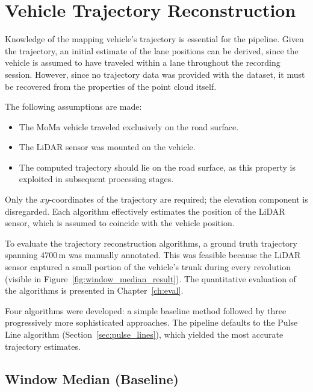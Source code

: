\section{Vehicle Trajectory Reconstruction}
\label{sec:car_trace}

Knowledge of the mapping vehicle's trajectory is essential for the pipeline. Given the trajectory, an initial estimate of the lane positions can be derived, since the vehicle is assumed to have traveled within a lane throughout the recording session. However, since no trajectory data was provided with the dataset, it must be recovered from the properties of the point cloud itself.

The following assumptions are made:
\begin{itemize}
  \item The MoMa vehicle traveled exclusively on the road surface.
  \item The LiDAR sensor was mounted on the vehicle.
  \item The computed trajectory should lie on the road surface, as this property is exploited in subsequent processing stages.
\end{itemize}

\noindent Only the $xy$-coordinates of the trajectory are required; the elevation component is disregarded. Each algorithm effectively estimates the position of the LiDAR sensor, which is assumed to coincide with the vehicle position.

To evaluate the trajectory reconstruction algorithms, a ground truth trajectory spanning $4700\,\mathrm{m}$ was manually annotated. This was feasible because the LiDAR sensor captured a small portion of the vehicle's trunk during every revolution (visible in Figure~\ref{fig:window_median_result}). The quantitative evaluation of the algorithms is presented in Chapter~\ref{ch:eval}.

Four algorithms were developed: a simple baseline method followed by three progressively more sophisticated approaches. The pipeline defaults to the Pulse Line algorithm (Section~\ref{sec:pulse_lines}), which yielded the most accurate trajectory estimates.

\FloatBarrier
\subsection{Window Median (Baseline)}
\label{sec:window_median}

